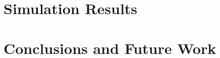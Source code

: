 \documentclass[conference]{IEEEtran}
\begin{document}
\section{Simulation Results}
\label{section4}
\section{Conclusions and Future Work}
\label{section5}




\renewcommand{\bibfont}{\footnotesize}


\end{document}

